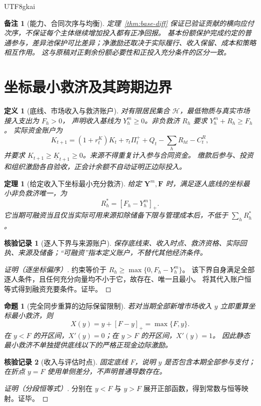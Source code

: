 \documentclass[12pt,a4paper,openany]{report}
\newtheorem{definition}{定义}[chapter]
\newtheorem{theorem}{定理}[chapter]
\newtheorem{proposition}{命题}[chapter]
\newtheorem{remark}{备注}[chapter]
\newtheorem{Certificate}{核验记录}[chapter]
\newcommand{\Original}{原稿}
\begin{document}
\begin{CJK*}{UTF8}{gkai}
\begin{remark}[能力、合同次序与均衡]
定理~\ref{thm:base-diff} 保证已验证贡献的横向应付次序，不保证每个主体继续增加投入都有正净回报。
基本份额保护完成约定的普通参与，差异池保护可比差异；净激励还取决于实际履行、收入保留、成本和策略相互作用。
这与\Original 对正剩余份额必要性和正投入充分条件的区分一致。
\end{remark}

\section{坐标最小救济及其跨期边界}

\begin{definition}[底线、市场收入与救济账户]
\label{def:relief}
对有限居民集合 $\mathcal H$，最低物质与真实市场接入支出为 $F_h>0$，
声明收入基线为 $Y_h^m\ge0$。非负救济 $R_h$ 要求 $Y_h^m+R_h\ge F_h$。
实际资金账户为
\[
 K_{t+1}=(1+r_t^K)K_t+\tau_t\Pi_t^++Q_t-\sum_hR_{ht}-C_t^R,
\]
并要求 $K_{t+1}\ge\underline K_{t+1}\ge0$。来源不得重复计入参与合同资金。
缴款后参与、投资和组织激励各自验收，正会计余额不自动证明正边际投入。
\end{definition}

\begin{theorem}[给定收入下坐标最小充分救济]
\label{thm:relief}
给定 $\mathbf Y^m,\mathbf F$ 时，满足逐人底线的坐标最小非负救济唯一，为
\[
 R_h^*=[F_h-Y_h^m]_+.
\]
它当期可融资当且仅当实际可用来源扣除储备下限与管理成本后，不低于 $\sum_hR_h^*$。
\end{theorem}
\begin{Certificate}[逐人下界与来源账户]
保存底线束、收入时点、救济资格、实际回执、来源及储备；“可融资”指本定义账户，不替代其他经济条件。
\end{Certificate}
\begin{proof}[证明（逐坐标偏序）]
约束等价于 $R_h\ge\max\{0,F_h-Y_h^m\}$。
该下界自身满足全部逐人条件，且任何充分向量均不小于它，故存在、唯一且最小。
将其代入账户恒等式得到融资充要条件。证毕。
\end{proof}

\begin{proposition}[完全同步重算的边际保留限制]
\label{prop:clawback}
若对当期全部新增市场收入 $y$ 立即重算坐标最小救济，则
\[
 X(y)=y+[F-y]_+=\max\{F,y\}.
\]
在 $y<F$ 的开区间，$X'(y)=0$；在 $y>F$ 的开区间，$X'(y)=1$。
因此静态最小救济不单独提供底线以下的严格正现金边际激励。
\end{proposition}
\begin{Certificate}[收入与评估时点]
固定底线 $F$，说明 $y$ 是否包含本期全部参与支付；在折点 $y=F$ 使用单侧差分，不声明普通导数存在。
\end{Certificate}
\begin{proof}[证明（分段恒等式）]
分别在 $y<F$ 与 $y>F$ 展开正部函数，得到常数与恒等映射。证毕。
\end{proof}


\end{CJK*}
\end{document}

